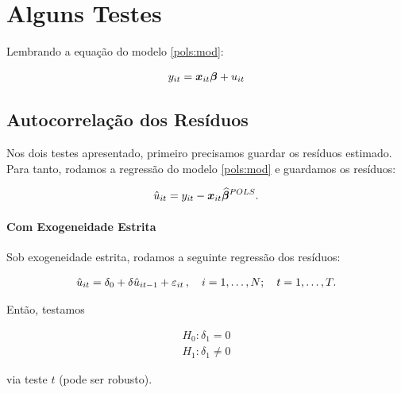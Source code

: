 \documentclass[11pt, oneside, a4paper, article]{article}
\numberwithin{equation}{section}
\begin{document}
\clearpage
\section{Alguns Testes}

Lembrando a equação do modelo \eqref{pols:mod}:

\vspace{-2 em}
\begin{align*}
	y_{it} = \boldsymbol{x}_{it} \boldsymbol{\beta} + u_{it}
\end{align*}

\subsection{Autocorrelação dos Resíduos}

Nos dois testes apresentado, primeiro precisamos guardar os resíduos estimado.
Para tanto, rodamos a regressão do modelo \eqref{pols:mod} e guardamos os resíduos:

\vspace{-1 em}
\begin{align} \label{pols:uhat}
	\hat{u}_{it} = y_{it} - \boldsymbol{x}_{it} \widehat{\boldsymbol{\beta}}^{POLS}.
\end{align}

\paragraph{Com Exogeneidade Estrita}
Sob exogeneidade estrita, rodamos a seguinte regressão dos resíduos:

\vspace{-1.5 em}
\begin{align*}
	\hat{u}_{it} = \delta_{0} + \delta \hat{u}_{it-1}  + \varepsilon_{it}
	\, , \quad i=1,\dots, N; \quad t=1,\dots, T.
\end{align*}

\noindent
Então, testamos

\vspace{-1 em}
\begin{align*}
H_{0} : \delta_{1} = 0
\\
H_{1} : \delta_{1} \neq 0
\end{align*}

\noindent
via teste $t$ (pode ser robusto).
\end{document}
